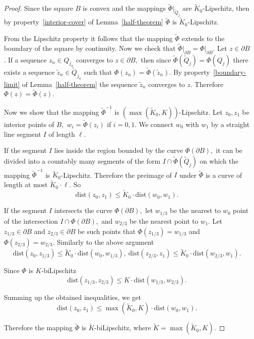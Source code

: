 \documentclass[12pt]{article}
\theoremstyle{definition}
\begin{document}
\begin{proof}
Since the square $B$ is convex and the mappings $\widetilde\Phi\big|_{\widetilde Q_j}$ are $\widetilde K_0$-Lipschitz, then by property~\ref{interior-cover} of Lemma~\ref{half-theorem} $\widetilde\Phi$ is $\widetilde K_0$-Lipschitz.

From the Lipschitz property it follows that the mapping $\widetilde\Phi$ extends to the boundary of the square by continuity. Now we check that $\widetilde \Phi\big|_{\partial B} = \Phi\big|_{\partial B}.$ Let $z\in\partial B$. If a sequence $z_n\in Q_{j_n}$ converges to $z\in\partial B,$ then since $\widetilde \Phi(\widetilde Q_j) = \Phi(Q_j)$ there exists a sequence $\widetilde z_n\in\widetilde Q_{j_n}$ such that $\Phi(z_n) = \widetilde \Phi(\widetilde z_n).$ By property~\ref{boundary-limit} of Lemma~\ref{half-theorem} the sequence $\widetilde z_n$ converges to $z$. Therefore $\Phi (z) = \widetilde \Phi(z).$

Now we show that the mapping $\widetilde\Phi^{-1}$ is $\left(\max\left(\widetilde K_0, K\right)\right)$-Lipschitz. Let $z_0,z_1$ be interior points of $B,$ $w_i = \widetilde\Phi(z_i)$ if $i=0,1.$ We connect $w_0$ with $w_1$ by a straight line segment $I$ of length $\ell.$ 

If the segment $I$ lies inside the region bounded by the curve $\Phi(\partial B),$ it can be divided into a countably many segments of the form $I\cap\widetilde\Phi(\widetilde Q_j)$ on which the mapping $\widetilde\Phi^{-1}$ is $\widetilde K_0$-Lipschitz. Therefore the preimage of $I$ under $\widetilde \Phi$ is a curve of length at most $\widetilde K_0\cdot\ell.$ So 
$$
\mathrm{dist}(z_0, z_1) \le \widetilde K_0\cdot\mathrm{dist}(w_0, w_1).
$$

If the segment $I$ intersects the curve $\Phi(\partial B),$ let $w_{1/3}$ be the nearest to $w_0$   point of the intersection $I\cap\Phi(\partial B),$ and $w_{2/3}$ be the nearest point to $w_1.$ Let $z_{1/3}\in\partial B$ and $z_{2/3}\in\partial B$ be such points that $\Phi(z_{1/3}) = w_{1/3}$ and $\Phi(z_{2/3}) = w_{2/3}.$ Similarly to the above argument
$$
\mathrm{dist}(z_0, z_{1/3}) \le \widetilde K_0\cdot\mathrm{dist}(w_0, w_{1/3}),\ 
\mathrm{dist}(z_{2/3},z_1) \le \widetilde K_0\cdot\mathrm{dist}(w_{2/3},w_1).
$$

Since $\Phi$ is $K$-biLipschitz
$$
\mathrm{dist}(z_{1/3},z_{2/3}) \le K\cdot\mathrm{dist}(w_{1/3},w_{2/3}).
$$

Summing up the obtained inequalities, we get
$$
\mathrm{dist}(z_0, z_1) \le \max\left(\widetilde K_0, K\right)\cdot\mathrm{dist}(w_0, w_1).
$$

Therefore the mapping $\widetilde \Phi$ is $\widetilde K$-biLipschitz, where $\widetilde K=\max\left(\widetilde K_0, K\right).$
\end{proof}
\end{document}
